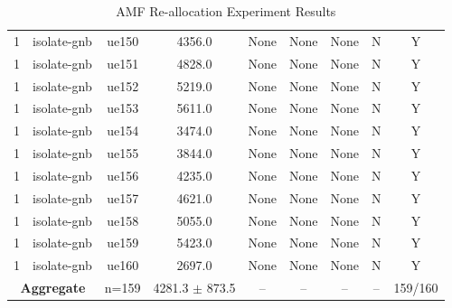 \begin{table}[ht]
\begin{tabular}{|c|c|c|c|c|c|c|c|c|}
1 & isolate-gnb & ue150 & 4356.0 & None & None & None & N & Y \\
1 & isolate-gnb & ue151 & 4828.0 & None & None & None & N & Y \\
1 & isolate-gnb & ue152 & 5219.0 & None & None & None & N & Y \\
1 & isolate-gnb & ue153 & 5611.0 & None & None & None & N & Y \\
1 & isolate-gnb & ue154 & 3474.0 & None & None & None & N & Y \\
1 & isolate-gnb & ue155 & 3844.0 & None & None & None & N & Y \\
1 & isolate-gnb & ue156 & 4235.0 & None & None & None & N & Y \\
1 & isolate-gnb & ue157 & 4621.0 & None & None & None & N & Y \\
1 & isolate-gnb & ue158 & 5055.0 & None & None & None & N & Y \\
1 & isolate-gnb & ue159 & 5423.0 & None & None & None & N & Y \\
1 & isolate-gnb & ue160 & 2697.0 & None & None & None & N & Y \\
\multicolumn{2}{|c|}{\textbf{Aggregate}} & n=159 & 4281.3 $\pm$ 873.5 & -- & -- & -- & -- & 159/160 \\
\hline
\end{tabular}
\caption{AMF Re-allocation Experiment Results}
\label{tab:amf_realloc}
\end{table}
